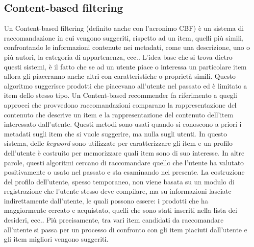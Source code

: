 %
\subsection{Content-based filtering}
Un Content-based filtering (definito anche con l'acronimo CBF) è un sistema di raccomandazione in cui vengono suggeriti, rispetto ad un item, quelli 
più simili, confrontando le informazioni contenute nei metadati, come una descrizione, uno o più autori, la categoria di 
appartenenza, ecc.. L'idea base che si trova dietro questi sistemi, è il fatto che se ad un utente piace o interessa un particolare 
item allora gli piaceranno anche altri con caratteristiche o proprietà simili.\hfill\break
Questo algoritmo suggerisce prodotti che piacevano all'utente nel passato ed è limitato a item dello stesso tipo. Un 
Content-based recommender fa riferimento a quegli approcci che provvedono raccomandazioni comparano la rappresentazione del 
contenuto che descrive un item e la rappresentazione del contenuto dell'item interessato dall'utente.\hfill\break
Questi metodi sono usati quando si conoscono a priori i metadati sugli item che si vuole suggerire, ma nulla sugli utenti.
In questo sistema, delle \textit{keyword} sono utilizzate per caratterizzare gli item e un profilo dell'utente è 
costruito per memorizzare quali item sono di suo interesse. In altre parole, questi algoritmi cercano di raccomandare quello che 
l'utente ha valutato positivamente o usato nel passato e sta esaminando nel presente. La costruzione del profilo dell'utente, 
spesso temporaneo, non viene basata su un modulo di registrazione che l'utente stesso deve compilare, ma su informazioni 
lasciate indirettamente dall'utente, le quali possono essere: i prodotti che ha maggiormente cercato e acquistato, quelli che sono 
stati inseriti nella lista dei desideri, ecc.. Più precisamente, tra vari item candidati da raccomandare all'utente si passa per un 
processo di confronto con gli item piaciuti dall'utente e gli item migliori vengono suggeriti.
%
